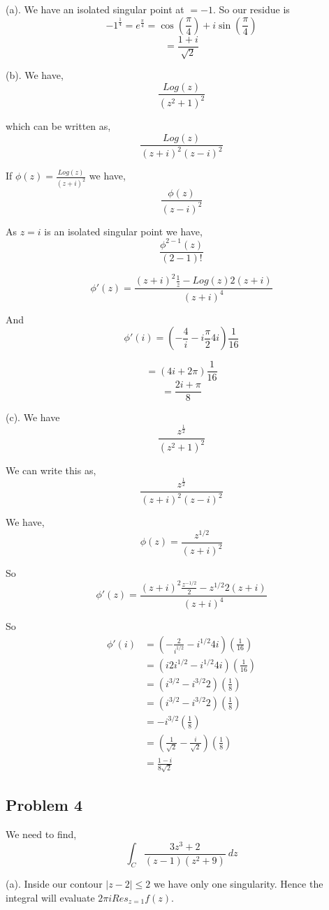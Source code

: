 \documentclass[a4paper]{report}
\begin{document}
(a). We have an isolated singular point at $ = -1$. So our residue is 
$$-1^{\frac{1}{4}} = e^{\frac{\pi}{4}} = \cos(\frac{\pi}{4}) + i \sin(\frac{\pi}{4})$$ 
$$ = \frac{1 + i}{\sqrt{2}} $$ 

(b). We have, 
$$ \frac{Log(z)}{(z^2 + 1)^2} $$ 

which can be written as, 
$$ \frac{Log(z)}{(z + i)^2(z - i)^2} $$ 

If  $\phi(z) = \frac{Log(z)}{(z + i)^2}$ we have, 
$$  \frac{\phi(z)}{(z - i)^2}$$ 

As $z =i$ is an isolated singular point we have, 
$$ \frac{\phi^{2 - 1}(z)}{(2 - 1)!} $$ 

$$\phi'(z) = \frac{(z + i)^2 \frac{1}{z} - Log(z) 2(z + i)}{(z + i)^4}$$

And $$\phi'(i) =( -\frac{4}{i} - i\frac{\pi}{2}4i  ) \frac{1}{16}$$

$$ =( 4i + 2\pi) \frac{1}{16} $$ 
$$ = \frac{2i + \pi}{8} $$ 


(c). We have $$\frac{z^{\frac{1}{2}}}{(z^2 + 1)^2}$$


We can write this as, 
$$ \frac{z^{\frac{1}{2}}}{(z + i)^2(z - i)^2} $$ 

We have, 
$$ \phi(z) = \frac{z^{1 /2}}{(z + i)^2} $$ 

So $$\phi'(z) = \frac{(z + i)^2 \frac{z^{-1/ 2}}{2} - z^{1 /2} 2(z + i)}{(z + i)^{4}} $$



So 
\begin{align*}
    \phi'(i) &= (-\frac{2}{i^{1/ 2}} - i^{1 /2}4i) ( \frac{1}{16})\\
             &= (i2i^{1 /2} - i^{1 /2}4i) ( \frac{1}{16})\\
             &= (i^{3 /2} - i^{3 /2}2) ( \frac{1}{8})\\
             &= (i^{3 /2} - i^{3 /2}2) ( \frac{1}{8})\\
             &= -i^{3 /2} ( \frac{1}{8})\\
             &= (\frac{1}{\sqrt{2}}  - \frac{i}{\sqrt{2}})( \frac{1}{8})\\
             &= \frac{1 - i}{8\sqrt{2}}
\end{align*}

\subsection*{Problem 4}
We need to find, 
$$ \int_C \frac{3z^{3} + 2}{(z - 1)(z^2 + 9)} \: dz $$ 

(a). Inside our contour $|z - 2| \le 2$ we have only one singularity. Hence the integral will evaluate  $2\pi i Res_{z = 1} f(z)$. 
\end{document}
